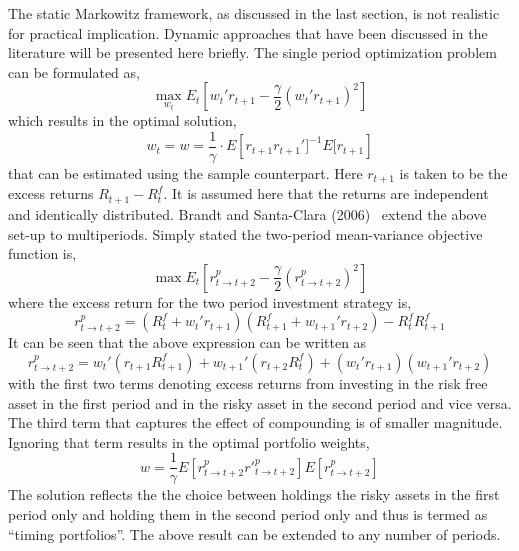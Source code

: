 The static Markowitz framework, as discussed in the last section, is not realistic for practical implication. Dynamic approaches that have been discussed in the literature will be presented here briefly. The single period optimization problem can be formulated as,
	\begin{equation}\label{eqn:periodopt}
	\max_{w_t} E_t \left[ w_t' r_{t+1} - \frac{\gamma}{2}(w_t' r_{t+1})^2\right]
	\end{equation} 
which results in the optimal solution,
	\begin{equation}\label{eqn:periodoptimal}
	w_t= w= \frac{1}{\gamma} \cdot E\left[r_{t+1} r_{t+1}']^{-1} E[r_{t+1}\right]
	\end{equation}	
that can be estimated using the sample counterpart. Here $r_{t+1}$ is taken to be the excess returns $R_{t+1} - R_t^f$. It is assumed here that the returns are independent and identically distributed. Brandt and Santa-Clara (2006)~\cite{bransc} extend the above set-up to multiperiods. Simply stated the two-period mean-variance objective function is,
	\begin{equation}\label{eqn:twoperiodmv}
	\max E_t \left[ r^p_{t \to t+2} - \frac{\gamma}{2} ( r^p_{t \to t+2})^2 \right]
	\end{equation}
where the excess return for the two period investment strategy is,
	\begin{equation}\label{eqn:twoperexcess}
	r^p_{t \to t+2} = (R_t^f + w_t' r_{t+1}) ( R^f_{t+1} + w_{t+1}' r_{t+2}) - R_t^f R_{t+1}^f
	\end{equation}	
It can be seen that the above expression can be written as 
	\begin{equation}\label{eqn:rewritten}
	r^p_{t \to t+2} = w_t' (r_{t+1} R_{t+1}^f) + w_{t+1}' (r_{t+2}R_t^f) + (w_t' r_{t+1})(w_{t+1}' r_{t+2})
	\end{equation}
with the first two terms denoting excess returns from investing in the risk free asset in the first period and in the risky asset in the second period and vice versa. The third term that captures the effect of compounding is of smaller magnitude. Ignoring that term results in the optimal portfolio weights,
	\begin{equation}\label{eqn:optimalweights}
	w= \frac{1}{\gamma} E\left[ r^{p}_{t \to t+2} {r'}^p_{t\to t+2} \right] E[r^{p}_{t \to t+2}]
	\end{equation}
The solution reflects the the choice between holdings the risky assets in the first period only and holding them in the second period only and thus is termed as ``timing portfolios''. The above result can be extended to any number of periods. \\



